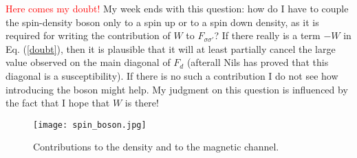 \documentclass[a4paper,11pt]{article}
\begin{document}
\textcolor{red} {Here comes my doubt!} My week ends with this question: how do I have to couple the spin-density boson only to a spin up or to a spin down density, as it is required for writing the contribution of $W$ to $F_{\sigma\sigma'}$? If there really is a term $-W$ in Eq. (\ref{doubt}), then it is plausible that it will at least partially cancel the large value observed on the main diagonal of $F_d$ (afterall Nils has proved that this diagonal is a susceptibility).
If there is no such a contribution I do not see how introducing the boson might help. My judgment on this question is influenced by the fact that I hope that $W$ is there!  

\begin{figure} 
\texttt{[image: spin\_boson.jpg]}
\caption{Contributions to the density and to the magnetic channel.} \label{density_and_magnetic}    

\end{figure} 
   


\vfill\eject

 
\end{document}

